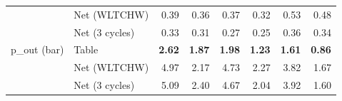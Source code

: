 \begin{table}[t]
\begin{tabular}{llrrrrrr}
 & Net (WLTCHW) & 0.39 & 0.36 & 0.37 & 0.32 & 0.53 & 0.48 \\
 & Net (3 cycles) & 0.33 & 0.31 & 0.27 & 0.25 & 0.36 & 0.34 \\
\addlinespace
p\_out (bar) & Table & \textbf{2.62} & \textbf{1.87} & \textbf{1.98} & \textbf{1.23} & \textbf{1.61} & \textbf{0.86} \\
 & Net (WLTCHW) & 4.97 & 2.17 & 4.73 & 2.27 & 3.82 & 1.67 \\
 & Net (3 cycles) & 5.09 & 2.40 & 4.67 & 2.04 & 3.92 & 1.60 \\
\bottomrule
\end{tabular}
\end{table}
